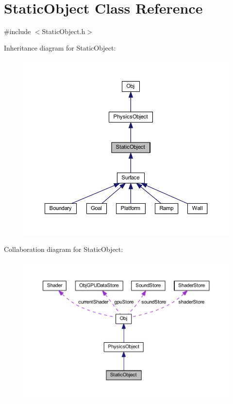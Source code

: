 \hypertarget{class_static_object}{}\section{Static\+Object Class Reference}
\label{class_static_object}


{\ttfamily \#include $<$Static\+Object.\+h$>$}



Inheritance diagram for Static\+Object\+:
\nopagebreak
\begin{figure}[H]
\begin{center}
\leavevmode
\includegraphics[width=350pt]{class_static_object__inherit__graph}
\end{center}
\end{figure}


Collaboration diagram for Static\+Object\+:
\nopagebreak
\begin{figure}[H]
\begin{center}
\leavevmode
\includegraphics[width=350pt]{class_static_object__coll__graph}
\end{center}
\end{figure}

